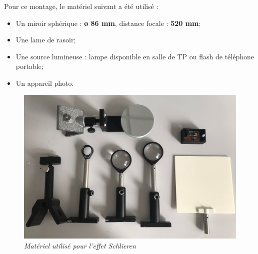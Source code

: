 \subsubsection{\large{}}
Pour ce montage, le matériel suivant a été utilisé :
\begin{itemize}
	\item Un miroir sphérique : \textbf{ø 86 mm}, distance focale : \textbf{520 mm};
	\item Une lame de rasoir;
	\item Une source lumineuse : lampe disponible en salle de TP ou flash de téléphone portable;
	\item Un appareil photo.
\end{itemize}
\begin{figure}[H]
	\centering
	\includegraphics[scale = 0.12]{figures/materiel.jpg}
	\caption{\small{\textit{Matériel utilisé pour l'effet Schlieren}}}
	\label{fig:materiel}
\end{figure}

